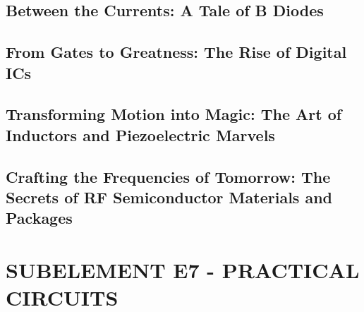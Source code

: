 \documentclass[12pt]{book}
\begin{document}
\section{Between the Currents: A Tale of B Diodes}











\section{From Gates to Greatness: The Rise of Digital ICs}











\section{Transforming Motion into Magic: The Art of Inductors and Piezoelectric Marvels}












\section{Crafting the Frequencies of Tomorrow: The Secrets of RF Semiconductor Materials and Packages}












\chapter{SUBELEMENT E7 - PRACTICAL CIRCUITS}
\end{document}
